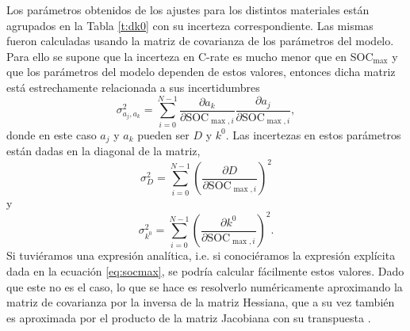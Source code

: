 Los parámetros obtenidos de los ajustes para los distintos materiales están
agrupados en la Tabla \ref{t:dk0} con su incerteza correspondiente. Las mismas
fueron calculadas usando la matriz de covarianza de los parámetros del modelo. 
Para ello se supone que la incerteza en C-rate es mucho menor que en 
SOC$_{\max}$ y que los parámetros del modelo dependen de estos valores, 
entonces dicha matriz está estrechamente relacionada a sus incertidumbres
\begin{equation}
    \sigma_{a_j, a_k}^2 = \sum_{i=0}^{N-1} \frac{\partial a_k}{\partial \text{SOC}_{\max,i}} \frac{\partial a_j}{\partial \text{SOC}_{\max,i}},
\end{equation}
donde en este caso $a_j$ y $a_k$ pueden ser $D$ y $k^0$. Las incertezas en 
estos parámetros están dadas en la diagonal de la matriz,
\begin{equation}
    \sigma_D^2 = \sum_{i=0}^{N-1} \left(\frac{\partial D}{\partial \text{SOC}_{\max,i}}\right)^2
\end{equation}
y
\begin{equation}
    \sigma_{k^0}^2 = \sum_{i=0}^{N-1} \left(\frac{\partial k^0}{\partial \text{SOC}_{\max,i}}\right)^2.
\end{equation}
Si tuviéramos una expresión analítica, i.e. si conociéramos la expresión 
explícita dada en la ecuación \ref{eq:socmax}, se podría calcular fácilmente
estos valores. Dado que este no es el caso, lo que se hace es resolverlo 
numéricamente aproximando la matriz de covarianza por la inversa de la matriz
Hessiana, que a su vez también es aproximada por el producto de la matriz
Jacobiana con su transpuesta \cite{bard1974}.
